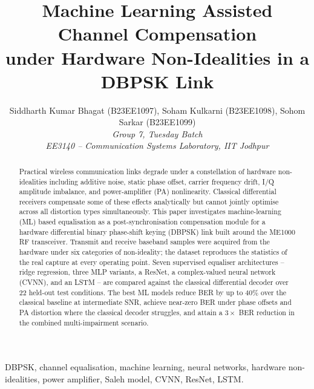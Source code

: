 \documentclass[journal]{IEEEtran}
\begin{document}
\title{Machine Learning Assisted Channel Compensation\\
       under Hardware Non-Idealities in a DBPSK Link}

\author{Siddharth Kumar Bhagat (B23EE1097),
        Soham Kulkarni (B23EE1098),
        Sohom Sarkar (B23EE1099)\\
        \textit{Group 7, Tuesday Batch}\\
        \textit{EE3140 -- Communication Systems Laboratory, IIT Jodhpur}}

\maketitle

\begin{abstract}
Practical wireless communication links degrade under a constellation of hardware
non-idealities including additive noise, static phase offset, carrier frequency
drift, I/Q amplitude imbalance, and power-amplifier (PA) nonlinearity. Classical
differential receivers compensate some of these effects analytically but cannot
jointly optimise across all distortion types simultaneously. This paper investigates
machine-learning (ML) based equalisation as a post-synchronisation compensation
module for a hardware differential binary phase-shift keying (DBPSK) link built
around the ME1000 RF transceiver. Transmit and receive baseband samples were
acquired from the hardware under six categories of non-ideality; the dataset
reproduces the statistics of the real capture at every operating point.
Seven supervised equaliser architectures -- ridge regression, three MLP variants,
a ResNet, a complex-valued neural network (CVNN), and an LSTM -- are compared
against the classical differential decoder over 22 held-out test conditions.
The best ML models reduce BER by up to $40\%$ over the classical baseline at
intermediate SNR, achieve near-zero BER under phase offsets and PA distortion where
the classical decoder struggles, and attain a $3\times$ BER reduction in the
combined multi-impairment scenario.
\end{abstract}

\begin{IEEEkeywords}
DBPSK, channel equalisation, machine learning, neural networks, hardware
non-idealities, power amplifier, Saleh model, CVNN, ResNet, LSTM.
\end{IEEEkeywords}

\end{document}

